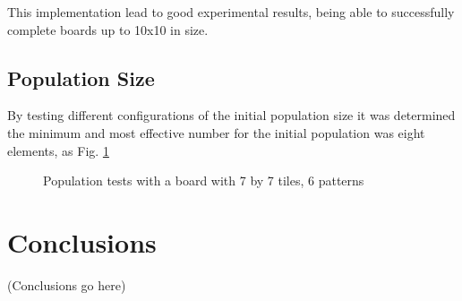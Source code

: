\documentclass{llncs}
\begin{document}
This implementation lead to good experimental results, being able to successfully complete boards up to 10x10 in size.

\subsection{Population Size}\label{sec:population_size}

By testing different configurations of the initial population size it was determined the minimum and most effective number for the initial population was eight elements, as Fig. \ref{fig:population_stats}

\begin{figure}[h]
	\centering
	\caption{Population tests with a board with 7 by 7 tiles, 6 patterns}
	\label{fig:population_stats}
\end{figure}

\section{Conclusions}\label{sec:conclusions}

(Conclusions go here)
%
%


\end{document}

